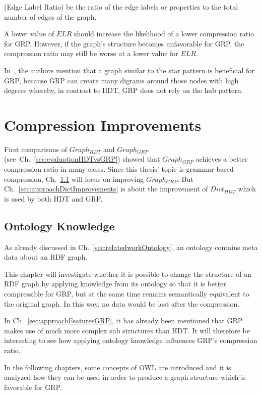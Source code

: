 (Edge Label Ratio) be the ratio of the edge labels or properties to the total number of edges of the graph. 

A lower value of $ELR$ should increase the likelihood of a lower compression ratio for GRP.  However, if the graph's structure becomes unfavorable for GRP, the compression ratio may still be worse at a lower value for $ELR$.

In~\cite{maneth}, the authors mention that a graph similar to the star pattern is beneficial for GRP, because GRP can create many digrams around those nodes with high degrees whereby, in contrast to HDT, GRP does not rely on the hub pattern.


\section{Compression Improvements}\label{sec:approachComprRatioImprovements}

First comparisons of $Graph_{HDT}$ and $Graph_{GRP}$ (see~Ch.~\ref{sec:evaluationHDTvsGRP}) showed that  $Graph_{GRP}$ achieves a better compression ratio in many cases. Since this thesis' topic is grammar-based compression, Ch.~\ref{sec:approachOntKnowledge} will focus on improving $Graph_{GRP}$. But Ch.~\ref{sec:approachDictImprovements} is about the improvement of $Dict_{HDT}$ which is used by both HDT and GRP.



\subsection{Ontology Knowledge}\label{sec:approachOntKnowledge}

As already discussed in Ch.~\ref{sec:relatedworkOntology}, an ontology contains meta data about an RDF graph.

This chapter will investigate whether it is possible to change the structure of an RDF graph by applying knowledge from its ontology so that it is better compressible for GRP, but at the same time remains semantically equivalent to the original graph. In this way, no data would be lost after the compression.

In Ch.~\ref{sec:approachFeaturesGRP}, it has already been mentioned that GRP makes use of much more complex sub structures than HDT. It will therefore be interesting to see how applying ontology knowledge influences GRP's compression ratio.

In the following chapters, some concepts of OWL are introduced and it is analyzed how they can be used in order to produce a graph structure which is favorable for GRP.

